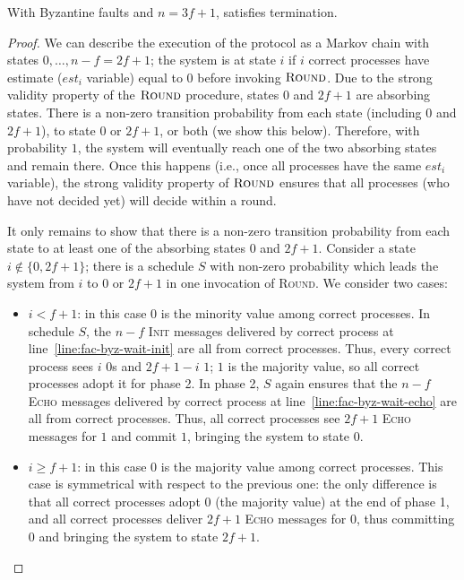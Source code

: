 \begin{theorem}\label{thm:termination-byz}
    With Byzantine faults and $n=3f+1$,  satisfies termination.
\end{theorem}
\begin{proof}
     We can describe the execution of the protocol as a Markov chain with states $0,\ldots,n-f=2f+1$; the system is at state $i$ if $i$ correct processes have estimate ($est_i$ variable) equal to $0$ before invoking $\textsc{Round}$. Due to the strong validity property of the $\textsc{Round}$ procedure, states $0$ and $2f+1$ are absorbing states. There is a non-zero transition probability from each state (including $0$ and $2f+1$), to state $0$ or $2f+1$, or both (we show this below). Therefore, with probability $1$, the system will eventually reach one of the two absorbing states and remain there. Once this happens (i.e., once all processes have the same $est_i$ variable), the strong validity property of $\textsc{Round}$ ensures that all processes (who have not decided yet) will decide within a round.
    
    It only remains to show that there is a non-zero transition probability from each state to at least one of the absorbing states $0$ and $2f+1$. Consider a state $i \notin \{0,2f+1\}$; there is a schedule $S$ with non-zero probability which leads the system from $i$ to $0$ or $2f+1$ in one invocation of \textsc{Round}. We consider two cases:
    \begin{itemize}
        \item $i < f+1$: in this case $0$ is the minority value among correct processes. In schedule $S$, the $n-f$ \textsc{Init} messages delivered by correct process at line~\ref{line:fac-byz-wait-init} are all from correct processes. Thus, every correct process sees $i$ $0$s and $2f+1-i$ $1$; $1$ is the majority value, so all correct processes adopt it for phase 2. In phase 2, $S$ again ensures that the $n-f$ \textsc{Echo} messages delivered by correct process at line~\ref{line:fac-byz-wait-echo} are all from correct processes. Thus, all correct processes see $2f+1$ \textsc{Echo} messages for $1$ and commit $1$, bringing the system to state $0$.
        \item $i \geq f+1$: in this case $0$ is the majority value among correct processes. This case is symmetrical with respect to the previous one: the only difference is that all correct processes adopt $0$ (the majority value) at the end of phase 1, and all correct processes deliver $2f+1$ \textsc{Echo} messages for $0$, thus committing $0$ and bringing the system to state $2f+1$.
    \end{itemize}
\end{proof}